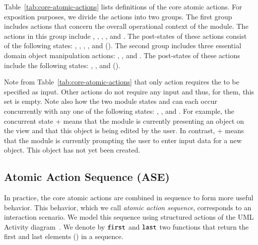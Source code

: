 Table~\ref{tab:core-atomic-actions} lists definitions of the core atomic actions. %
For exposition purposes, we divide the actions into two groups. %
The first group includes actions that concern the overall operational context of the module.
The actions in this group include , , , , and . The post-states of these actions consist of the following states: , , , , and  (\resp). 
%
The second group includes three essential domain object manipulation actions: , , and . The post-states of these actions include the following states: , , and  (\resp).
%

Note from Table~\ref{tab:core-atomic-actions} that only action  requires the  to be specified as input. Other actions do not require any input and thus, for them, this set is empty. Note also how the two module states  and  can each occur concurrently with any one of the following states: , , and . For example, the concurrent state  +  means that the module is currently presenting an object on the view and that this object is being edited by the user. In contrast,  +  means that the module is currently prompting the user to enter input data for a new object. This object has not yet been created.

\subsection{Atomic Action Sequence (ASE)} \label{sect:arch-ase}

In practice, the core atomic actions are combined in sequence to form more useful behavior. This behavior, which we call \textit{atomic action sequence}, corresponds to an interaction scenario. We model this sequence using structured actions of the UML Activity diagram~\cite{omg_unified_2017}. We denote by $\func{first}$ and $\func{last}$ two functions that return the first and last elements (\resp) in a sequence.

